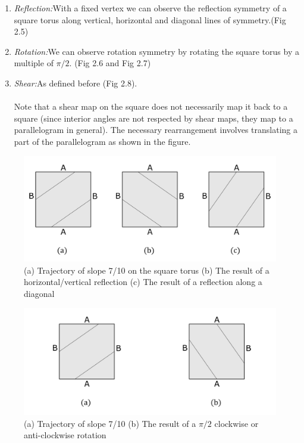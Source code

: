 \documentclass{report}
\begin{document}
\begin{enumerate}
\item  {\emph{Reflection:}With a fixed vertex we can observe the reflection symmetry of a square torus along vertical, horizontal and diagonal lines of symmetry.(Fig 2.5) }


\item  {\emph{Rotation:}We can observe rotation symmetry by rotating the square torus by a multiple of $\pi/2$. (Fig 2.6 and Fig 2.7)}

\item  {\emph{Shear:}As defined before (Fig 2.8). \\  \\ Note that a shear map on the square does not necessarily map it back to a square (since interior angles are not respected by shear maps, they map to a parallelogram in general). The necessary rearrangement involves translating a part of the parallelogram as shown in the figure. }

\end{enumerate}


\begin{figure} 
\begin{center}
\includegraphics[scale=0.3]{2.5}
\caption{(a) Trajectory of slope 7/10 on the square torus (b) The result of a horizontal/vertical reflection (c) The result of a reflection along a diagonal}
\end{center}
\end{figure}

\begin{figure} 
\begin{center}
\includegraphics[scale=0.3]{2.6}
\caption{(a) Trajectory of slope 7/10 (b) The result of a $\pi/2$ clockwise or anti-clockwise rotation}
\end{center}
\end{figure}
\end{document}
